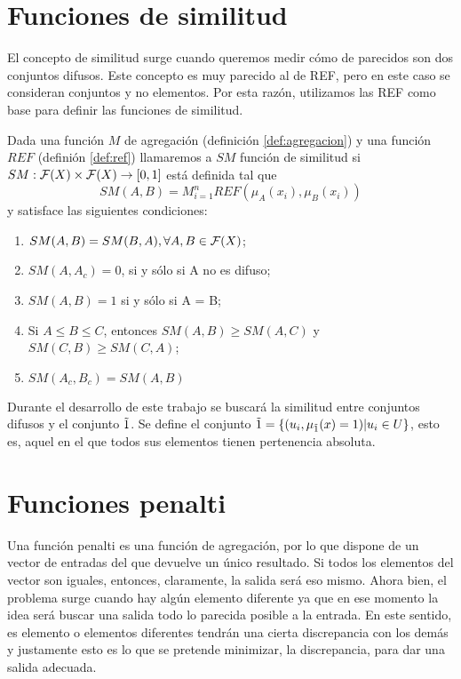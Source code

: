 \section{Funciones de similitud}\label{sec:similitud}
El concepto de similitud \cite{art:fan1, art:fan2} surge cuando queremos medir cómo de parecidos son dos conjuntos difusos. Este concepto es muy parecido al de REF, pero en este caso se consideran conjuntos y no elementos. Por esta razón, utilizamos las REF como base para definir las funciones de similitud.
\begin{definition}\label{def:similitud}
Dada una función $M$ de agregación (definición \ref{def:agregacion}) y una función $REF$ (definión \ref{def:ref}) llamaremos a $SM$ función de similitud si $SM : \mathcal{F}(X) \times \mathcal{F}(X) \rightarrow [0,1]$ está definida tal que 
$$SM(A,B)=M^n_{i=1}REF(\mu_A(x_i), \mu_B(x_i))$$
y satisface las siguientes condiciones:
	\begin{enumerate}
	\item $SM(A, B) = SM(B, A), \forall A, B \in \mathcal{F}(X)$;
	\item $SM(A, A_c) = 0$, si y sólo si A no es difuso;
	\item $SM(A, B) = 1$ si y sólo si A = B;
	\item Si $A\leq B\leq C$, entonces $SM(A, B)\geq SM(A,C)$ y $SM(C, B)\geq SM(C,A)$;
	\item $SM(A_c, B_c) = SM(A,B)$
	\end{enumerate}	
\end{definition}

\begin{remark}\label{obs:funcionesref}
Durante el desarrollo de este trabajo se buscará la similitud entre conjuntos difusos y el conjunto $\tilda1$. Se define el conjunto $\tilda1 =\{(u_{i}, \mu_{\tilda1}(x)=1)|u_{i}\in U \}$, esto es, aquel en el que todos sus elementos tienen pertenencia absoluta.
\end{remark}


\section{Funciones penalti}\label{sec:penalti}
Una función penalti  \cite{art:calvo} es una función de agregación, por lo que dispone de un vector de entradas del que devuelve un único resultado. Si todos los elementos del vector son iguales, entonces, claramente, la salida será eso mismo. Ahora bien, el problema surge cuando hay algún elemento diferente ya que en ese momento la idea será buscar una salida todo lo parecida posible a la entrada. En este sentido, es elemento o elementos diferentes tendrán una cierta discrepancia con los demás y justamente esto es lo que se pretende minimizar, la discrepancia, para dar una salida adecuada. 

